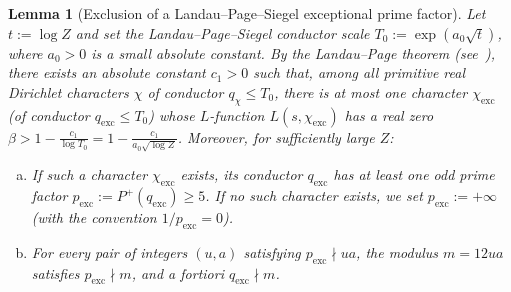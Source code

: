 \documentclass[11pt, a4paper]{article}
\theoremstyle{plain}
\newtheorem{lemma}[theorem]{Lemma}
\theoremstyle{definition}
\begin{document}
\begin{lemma}[Exclusion of a Landau--Page--Siegel exceptional prime factor]\label{lem:exclusion_p_exc}
Let $t := \log Z$ and set the Landau--Page--Siegel conductor scale $T_0 := \exp(a_0 \sqrt{t})$, where $a_0 > 0$ is a small absolute constant. By the Landau--Page theorem (see~\cite[Chap.~14]{davenport}), there exists an absolute constant $c_1 > 0$ such that, among all primitive real Dirichlet characters $\chi$ of conductor $q_\chi \le T_0$, there is at most one character $\chi_{\mathrm{exc}}$ (of conductor $q_{\mathrm{exc}} \le T_0$) whose $L$-function $L(s, \chi_{\mathrm{exc}})$ has a real zero $\beta > 1 - \frac{c_1}{\log T_0} = 1 - \frac{c_1}{a_0\sqrt{\log Z}}$. Moreover, for sufficiently large $Z$:
\begin{enumerate}[(a)]
    \item If such a character $\chi_{\mathrm{exc}}$ exists, its conductor $q_{\mathrm{exc}}$ has at least one odd prime factor $p_{\mathrm{exc}} := P^+(q_{\mathrm{exc}}) \ge 5$. If no such character exists, we set $p_{\mathrm{exc}} := +\infty$ (with the convention $1/p_{\mathrm{exc}} = 0$).
    \item For every pair of integers $(u,a)$ satisfying $p_{\mathrm{exc}} \nmid ua$, the modulus $m = 12ua$ satisfies $p_{\mathrm{exc}} \nmid m$, and a fortiori $q_{\mathrm{exc}} \nmid m$.
\end{enumerate}
\end{lemma}
\end{document}
